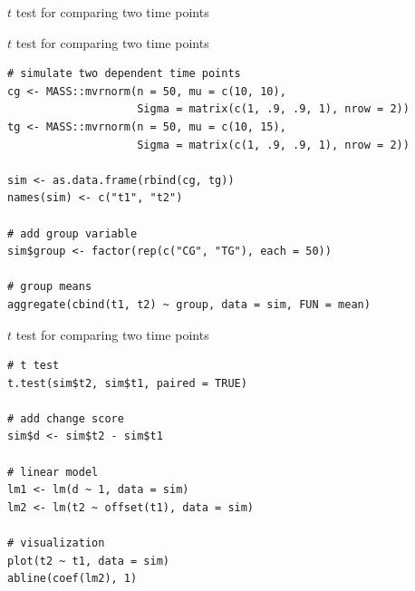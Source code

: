 \documentclass[aspectratio=169]{beamer}
\begin{document}
\begin{frame}{$t$ test for comparing two time points}
\begin{center}
\end{center}
\end{frame}

\begin{frame}[fragile]{$t$ test for comparing two time points}
\begin{lstlisting}
# simulate two dependent time points
cg <- MASS::mvrnorm(n = 50, mu = c(10, 10),
                    Sigma = matrix(c(1, .9, .9, 1), nrow = 2))
tg <- MASS::mvrnorm(n = 50, mu = c(10, 15),
                    Sigma = matrix(c(1, .9, .9, 1), nrow = 2))

sim <- as.data.frame(rbind(cg, tg))
names(sim) <- c("t1", "t2")

# add group variable
sim$group <- factor(rep(c("CG", "TG"), each = 50))

# group means
aggregate(cbind(t1, t2) ~ group, data = sim, FUN = mean)
\end{lstlisting}
\end{frame}

\begin{frame}[fragile]{$t$ test for comparing two time points}
\begin{lstlisting}
# t test
t.test(sim$t2, sim$t1, paired = TRUE)

# add change score
sim$d <- sim$t2 - sim$t1

# linear model
lm1 <- lm(d ~ 1, data = sim)
lm2 <- lm(t2 ~ offset(t1), data = sim)

# visualization
plot(t2 ~ t1, data = sim)
abline(coef(lm2), 1)
\end{lstlisting}
\end{frame}
\end{document}
